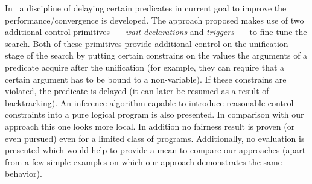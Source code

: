 In~\cite{Naish1985AutomatingCF} a discipline of delaying certain predicates in current goal to improve the performance/convergence is developed. The approach proposed makes use of two
additional control primitives~--- \emph{wait declarations} and \emph{triggers}~--- to fine-tune the search. Both of these primitives provide additional control on the unification stage
of the search by putting certain constrains on the values the arguments of a predicate acquire after the unification (for example, they can require that a certain argument has to be
bound to a non-variable). If these constrains are violated, the predicate is delayed (it can later be resumed as a result of backtracking). An inference algorithm capable to introduce
reasonable control constraints into a pure logical program is also presented. In comparison with our approach this one looks more local. In addition no fairness result is proven
(or even pursued) even for a limited class of programs. Additionally, no evaluation is presented which would help to provide a mean to compare our approaches (apart from a few simple
examples on which our approach demonstrates the same behavior).
